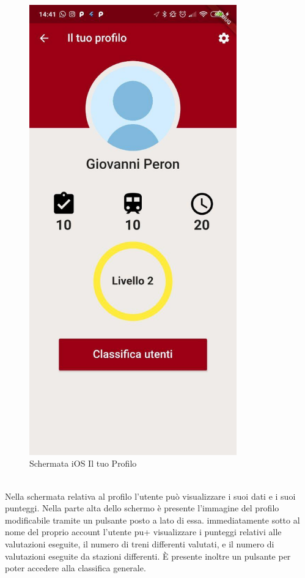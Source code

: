 \hfill
\begin{minipage}{0.45\textwidth}
	\begin{figure}[H]
		\centering
		\includegraphics[width=0.8\textwidth]{immagini/profile.jpg}
		\caption{Schermata iOS Il tuo Profilo}
	\end{figure}
\end{minipage}
\vspace{1cm}
\\
Nella schermata relativa al profilo l'utente può visualizzare i suoi dati e i suoi punteggi. Nella parte alta dello schermo è presente l'immagine del profilo modificabile tramite un pulsante posto a lato di essa. immediatamente sotto al nome del proprio account l'utente pu+ visualizzare i punteggi relativi alle valutazioni eseguite, il numero di treni differenti valutati, e il numero di valutazioni eseguite da stazioni differenti. È presente inoltre un pulsante per poter accedere alla classifica generale.

